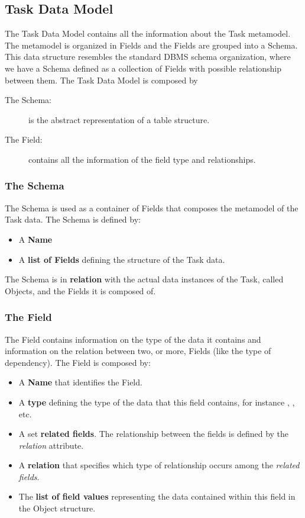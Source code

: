 \subsection{Task Data Model}\label{data:model}
The Task Data Model contains all the information about the Task metamodel. The
metamodel is organized in Fields and the Fields are grouped into a Schema. This
data structure resembles the standard DBMS schema organization, where we have
a Schema defined as a collection of Fields with possible relationship between
them. The Task Data Model is composed by
\begin{description}
    \item[The Schema:] is the abstract representation of a table structure.
    \item[The Field:] contains all the information of the field type and
    relationships.
\end{description}


\subsubsection{The Schema}
The Schema is used as a container of Fields that composes the metamodel of the
Task data. The Schema is defined by:
\begin{itemize}
    \item A \textbf{Name}

    \item A \textbf{list of Fields} defining the structure of the Task data.
\end{itemize}

The Schema is in \textbf{relation} with the actual data instances of the Task,
called Objects, and the Fields it is composed of.


\subsubsection{The Field}
The Field contains information on the type of the data it contains and information
on the relation between two, or more, Fields (like the type of dependency).
The Field is composed by:
\begin{itemize}
    \item A \textbf{Name} that identifies the Field.
    
    \item A \textbf{type} defining the type of the data that this field contains,
    for instance , , etc.

    \item A set \textbf{related fields}. The relationship between the fields
    is defined by the \emph{relation} attribute.
    
    \item A \textbf{relation} that specifies which type of relationship occurs
    among the \emph{related fields}.

    \item The \textbf{list of field values} representing the data contained within
    this field in the Object structure.
\end{itemize}


